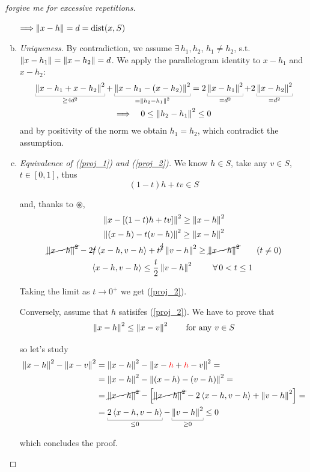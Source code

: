 \begin{proof}[forgive me for excessive repetitions]
\begin{enumerate}[(a)]
$\Longrightarrow \left\lVert x-h \right\rVert=d=\text{dist}(x,S)$

\item \emph{Uniqueness.} By contradiction, we assume $\exists\,h_1,h_2$, $h_1\neq h_2$, s.t. $\left\lVert x-h_1 \right\rVert=\left\lVert x-h_2 \right\rVert=d$. We apply the parallelogram identity to $x-h_1$ and $x-h_2$:
\begin{gather*}
\underbracket[0.2pt]{\norm{x-h_1+x-h_2}^2}_{\geq 4d^2}+\underbracket[0.2pt]{\norm{x-h_1-(x-h_2)}^2}_{=\norm{h_2-h_1}^2}=2\underbracket[0.2pt]{\norm{x-h_1}^2}_{= d^2}+2\underbracket[0.2pt]{\norm{x-h_2}^2}_{= d^2} \\
\Longrightarrow\quad 0\leq \norm{h_2-h_1}^2\leq 0
\end{gather*}
and by positivity of the norm we obtain $h_1=h_2$, which contradict the assumption.

\item \emph{Equivalence of (\ref{proj_1}) and (\ref{proj_2}).} We know $h\in S$, take any $v\in S$, $t\in[0,1]$, thus
\begin{equation*}
    (1-t)h+tv \in S
\end{equation*}

and, thanks to $\circledast$,
\begin{gather*}
\norm{x-\left[ (1-t)h+tv \right]}^2\geq \norm{x-h}^2 \\
\norm{(x-h)-t(v-h)}^2 \geq \norm{x-h}^2 \\
\cancel{\norm{x-h}^2}-2\cancel{t}\sca{x-h,v-h}+t^{\cancel{2}}\norm{v-h}^2\geq \cancel{\norm{x-h}^2} \qquad (t\neq 0) \\
\qquad \sca{x-h,v-h}\leq \frac{t}{2}\norm{v-h}^2\qquad\ \forall 0<t\leq 1
\end{gather*}

Taking the limit as $t\to 0^+$ we get (\ref{proj_2}).

Conversely, assume that $h$ satisifes (\ref{proj_2}). We have to prove that 
\begin{equation*}
\left\lVert x-h \right\rVert^2\leq \left\lVert x-v \right\rVert^2\qquad\text{for any }v\in S
\end{equation*}

so let's study 
\begin{align*}
\norm{x-h}^2-\norm{x-v}^2 &= \norm{x-h}^2-\norm{x-\textcolor{red}{h}+\textcolor{red}{h}-v}^2 = \\
&= \norm{x-h}^2-\norm{(x-h)-(v-h)}^2 = \\
&= \cancel{\norm{x-h}^2}- \left[ \cancel{\norm{x-h}^2} -2 \sca{x-h,v-h} + \norm{v-h}^2 \right] = \\
&=\underbracket[0.2pt]{2 \sca{x-h,v-h}}_{\leq 0}-\underbracket[0.2pt]{\norm{v-h}^2}_{\geq 0} \leq 0
\end{align*}

which concludes the proof.
\end{enumerate}
\end{proof}

